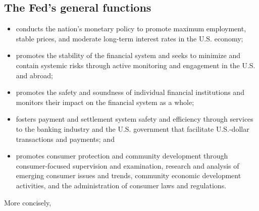 \documentclass{report}
\begin{document}
     \subsection{The Fed's general functions}
     \begin{itemize}
         \item conducts the nation’s monetary policy to promote maximum employment, stable prices, and moderate long-term interest rates in the U.S. economy;
         \item promotes the stability of the financial system and seeks to minimize and contain systemic risks through active monitoring and engagement in the U.S. and abroad;
         \item promotes the safety and soundness of individual financial institutions and monitors their impact on the financial system as a whole;
         \item fosters payment and settlement system safety and efficiency through services to the banking industry and the U.S. government that facilitate U.S.-dollar transactions and payments; and
         \item promotes consumer protection and community development through consumer-focused supervision and examination, research and analysis of emerging consumer issues and trends, community economic development activities, and the administration of consumer laws and regulations.
     \end{itemize}
     \bigbreak \noindent 
        More concisely, 
\end{document}
